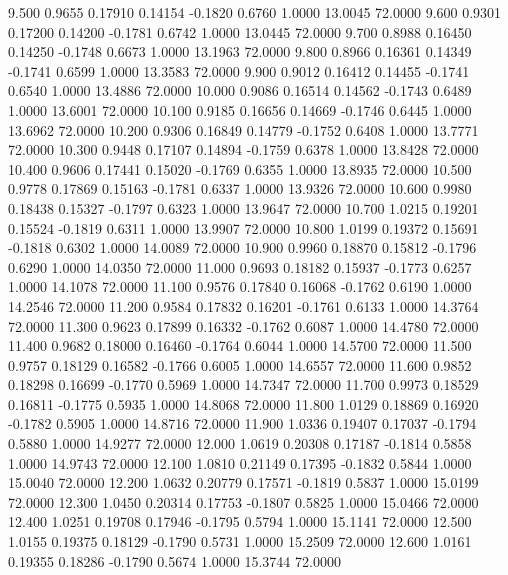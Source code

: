    9.500   0.9655   0.17910   0.14154  -0.1820   0.6760   1.0000  13.0045  72.0000
   9.600   0.9301   0.17200   0.14200  -0.1781   0.6742   1.0000  13.0445  72.0000
   9.700   0.8988   0.16450   0.14250  -0.1748   0.6673   1.0000  13.1963  72.0000
   9.800   0.8966   0.16361   0.14349  -0.1741   0.6599   1.0000  13.3583  72.0000
   9.900   0.9012   0.16412   0.14455  -0.1741   0.6540   1.0000  13.4886  72.0000
  10.000   0.9086   0.16514   0.14562  -0.1743   0.6489   1.0000  13.6001  72.0000
  10.100   0.9185   0.16656   0.14669  -0.1746   0.6445   1.0000  13.6962  72.0000
  10.200   0.9306   0.16849   0.14779  -0.1752   0.6408   1.0000  13.7771  72.0000
  10.300   0.9448   0.17107   0.14894  -0.1759   0.6378   1.0000  13.8428  72.0000
  10.400   0.9606   0.17441   0.15020  -0.1769   0.6355   1.0000  13.8935  72.0000
  10.500   0.9778   0.17869   0.15163  -0.1781   0.6337   1.0000  13.9326  72.0000
  10.600   0.9980   0.18438   0.15327  -0.1797   0.6323   1.0000  13.9647  72.0000
  10.700   1.0215   0.19201   0.15524  -0.1819   0.6311   1.0000  13.9907  72.0000
  10.800   1.0199   0.19372   0.15691  -0.1818   0.6302   1.0000  14.0089  72.0000
  10.900   0.9960   0.18870   0.15812  -0.1796   0.6290   1.0000  14.0350  72.0000
  11.000   0.9693   0.18182   0.15937  -0.1773   0.6257   1.0000  14.1078  72.0000
  11.100   0.9576   0.17840   0.16068  -0.1762   0.6190   1.0000  14.2546  72.0000
  11.200   0.9584   0.17832   0.16201  -0.1761   0.6133   1.0000  14.3764  72.0000
  11.300   0.9623   0.17899   0.16332  -0.1762   0.6087   1.0000  14.4780  72.0000
  11.400   0.9682   0.18000   0.16460  -0.1764   0.6044   1.0000  14.5700  72.0000
  11.500   0.9757   0.18129   0.16582  -0.1766   0.6005   1.0000  14.6557  72.0000
  11.600   0.9852   0.18298   0.16699  -0.1770   0.5969   1.0000  14.7347  72.0000
  11.700   0.9973   0.18529   0.16811  -0.1775   0.5935   1.0000  14.8068  72.0000
  11.800   1.0129   0.18869   0.16920  -0.1782   0.5905   1.0000  14.8716  72.0000
  11.900   1.0336   0.19407   0.17037  -0.1794   0.5880   1.0000  14.9277  72.0000
  12.000   1.0619   0.20308   0.17187  -0.1814   0.5858   1.0000  14.9743  72.0000
  12.100   1.0810   0.21149   0.17395  -0.1832   0.5844   1.0000  15.0040  72.0000
  12.200   1.0632   0.20779   0.17571  -0.1819   0.5837   1.0000  15.0199  72.0000
  12.300   1.0450   0.20314   0.17753  -0.1807   0.5825   1.0000  15.0466  72.0000
  12.400   1.0251   0.19708   0.17946  -0.1795   0.5794   1.0000  15.1141  72.0000
  12.500   1.0155   0.19375   0.18129  -0.1790   0.5731   1.0000  15.2509  72.0000
  12.600   1.0161   0.19355   0.18286  -0.1790   0.5674   1.0000  15.3744  72.0000
